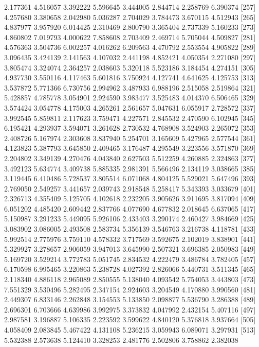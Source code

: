 \documentclass[12pt]{article}
\begin{document}
\begin{Schunk}
\begin{Soutput}
[249] 2.177361 4.516057 3.392222 5.596645 3.444005 2.844714 2.258769 6.390374
[257] 4.257680 3.380658 2.042980 5.036287 2.704029 3.784473 3.670115 4.512943
[265] 4.837977 3.957920 6.014425 2.310469 2.800790 3.365404 2.737339 5.160233
[273] 4.860802 7.019793 4.000622 7.858608 2.703409 2.469714 5.705044 4.509827
[281] 4.576363 3.504736 6.002257 4.016262 6.209563 4.470792 2.553554 4.905822
[289] 3.096435 3.424139 2.141563 4.107032 2.441198 4.852421 4.050354 2.271080
[297] 3.805474 3.324074 2.364257 2.038603 5.320118 5.523186 3.184454 4.274151
[305] 4.937730 3.550116 4.117463 5.601816 3.750924 4.127741 4.641625 4.125753
[313] 3.537872 5.771366 6.730756 2.994962 3.487933 6.988196 2.515058 2.519864
[321] 5.428857 4.785778 3.054901 2.924590 3.983477 3.525483 4.014370 6.506465
[329] 3.574424 3.054778 4.175003 4.265261 2.561657 5.047631 6.055917 2.728572
[337] 3.992545 5.859811 2.117623 3.759471 4.227571 2.845532 2.470590 6.102945
[345] 6.195421 4.293937 3.594071 3.261628 2.730532 4.768908 3.524903 2.265072
[353] 2.408726 5.167974 2.303608 3.837940 5.254701 3.165609 5.427965 2.577544
[361] 4.123823 5.387793 3.645850 2.409465 3.176487 4.295549 3.223556 3.571870
[369] 2.204802 3.349139 4.270476 4.043840 2.627503 5.512259 4.260885 2.324863
[377] 3.492123 5.634774 3.409738 5.885335 2.981391 5.566496 2.134119 3.038665
[385] 3.119445 6.410486 5.728537 3.805514 6.071068 4.804125 5.529021 5.647496
[393] 2.769050 2.549257 3.441657 2.039743 2.918548 5.258417 5.343393 3.033679
[401] 2.326713 4.355409 5.125705 4.102618 2.232205 3.905626 3.911695 3.817094
[409] 6.051202 4.485420 2.609442 2.837766 4.077690 4.677832 2.018645 6.637065
[417] 5.150987 3.291233 5.449095 5.926106 2.433403 3.290174 2.460427 3.984669
[425] 3.083902 3.086005 2.493508 2.583734 5.356139 3.546763 3.216738 4.118781
[433] 5.992514 2.775976 3.759110 4.578332 3.717569 3.592675 2.102019 3.838901
[441] 5.329927 3.278657 2.906059 3.947013 3.645990 2.507321 3.696385 2.050983
[449] 5.169720 3.529214 3.772783 5.051745 2.834532 4.222479 3.486784 3.782405
[457] 6.170598 6.995465 3.220863 5.238728 4.027392 2.826066 5.440731 3.511345
[465] 2.118340 4.886118 2.965089 2.850555 5.138040 4.093542 5.754053 3.443803
[473] 7.551329 3.530496 5.282495 2.347154 2.924603 3.204549 4.170880 3.990560
[481] 2.449307 6.833146 2.262848 3.154553 5.133850 2.098877 5.536790 3.286388
[489] 2.696301 6.703666 4.639986 3.992975 3.373832 4.047992 2.432154 5.407116
[497] 2.987581 3.196887 5.106335 2.223592 3.599622 4.840120 5.376818 3.937664
[505] 4.058409 2.083845 5.467422 4.131108 5.236215 3.059943 6.089071 3.297931
[513] 5.532388 2.573638 5.124410 3.328253 2.481776 2.502806 3.758862 2.382038

\end{Soutput}
\end{Schunk}
\end{document}
